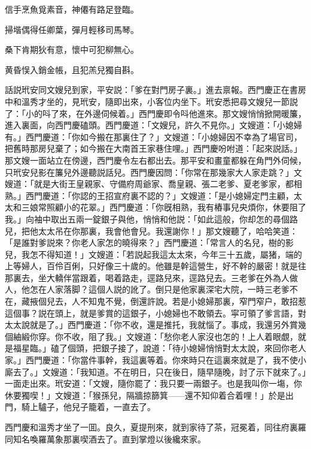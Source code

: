 信手烹魚覓素音，神僊有路足登臨。

掃堦偶得任卿葉，彈月輕移司馬琴。

桑下肯期狄有意，懷中可犯柳無心。

黄昏悮入銷金帳，且犯羔兒獨自斟。

話説玳安同文嫂兒到家，平安説：「爹在對門房子裏。」進去禀報。西門慶正在書房中和溫秀才坐的，見玳安，隨即出來，小客位内坐下。玳安悉把尋文嫂兒一節説了：「小的呌了來，在外邊伺候着。」西門慶即令呌他進來。那文嫂悄悄掀開暖簾，進入裏面，向西門慶磕頭。西門慶道：「文嫂兒，許久不見你。」文嫂道：「小媳婦有。」西門慶道：「你如今搬在那裏住了？」文嫂道：「小媳婦因不幸為了場官司，把舊時那房兒棄了；如今搬在大南首王家巷住哩。」西門慶吩咐道：「起來説話。」那文嫂一面站立在傍邊，西門慶令左右都出去。那平安和畫童都躲在角門外伺候，只玳安兒影在簾兒外邊聽説話兒。西門慶因問：「你常在那幾家大人家走跳？」文嫂道：「就是大街王皇親家、守備府周爺家、喬皇親、張二老爹、夏老爹家，都相熟。」西門慶道：「你認的王招宣府裏不認的？」文嫂道：「是小媳婦定門主顧，太太和三娘常照顧小的花翠。」西門慶道：「你旣相熟，我有樁事兒央煩你，休要阻了我。」向袖中取出五兩一錠銀子與他，悄悄和他説：「如此這般，你却怎的尋個路兒，把他太太吊在你那裏，我會他會兒。我還謝你！」那文嫂聽了，哈哈笑道：「是誰對爹説來？你老人家怎的曉得來？」西門慶道：「常言人的名兒，樹的影兒，我怎不得知道！」文嫂道：「若説起我這太太來，今年三十五歲，屬猪，端的上等婦人，百伶百俐，只好像三十歲的。他雖是幹這營生，好不幹的嚴密！就是往那裏去，坐大轎伴當跟着，喝着路走，逕路兒來，逕路兒去。三老爹在外為人做人，他怎在人家落脚？這個人説的訛了。倒只是他家裏深宅大院，一時三老爹不在，藏掖個兒去，人不知鬼不覺，倒還許說。若是小媳婦那裏，窄門窄户，敢招惹這個事？説在頭上，就是爹賞的這銀子，小媳婦也不敢領去。寜可領了爹言語，對太太說就是了。」西門慶道：「你不收，還是推托，我就惱了。事成，我還另外賞幾個紬緞你穿。你不收，阻了我。」文嫂道：「愁你老人家沒也怎的！上人着眼覷，就是福星臨。」磕了個頭，把銀子接了，說道：「待小媳婦悄悄對太太說，來回你老人家。」西門慶道：「你當件事幹，我這裏等着。你來時只在這裏來就是了，我不使小廝去了。」文嫂道：「我知道。不在明日，只在後日，隨早隨晚，討了示下就來了。」一面走出來。玳安道：「文嫂，隨你罷了：我只要一兩銀子。也是我叫你一塲，你休要獨喫！」文嫂道：「猴孫兒，隔牆掠篩箕——還不知仰着合着哩！」於是出門，騎上驢子，他兒子籠着，一直去了。

西門慶和溫秀才坐了一囬。良久，夏提刑來，就到家待了茶，冠冕着，同往府裏羅同知名喚羅萬象那裏喫酒去了。直到掌燈以後纔來家。

